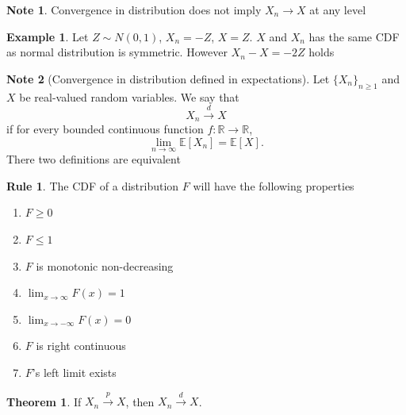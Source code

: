 \documentclass[11pt]{article}
\theoremstyle{definition}
\newtheorem{reg}{Rule}[section]
\newtheorem{note}{Note}[section]
\newtheorem{exmp}{Example}[section]
\newtheorem{theo}{Theorem}[section]
\begin{document}
\begin{note}
    Convergence in distribution does not imply $X_n \rightarrow X$ at any level
\end{note}
\begin{exmp}
Let $Z\sim N(0,1)$, $X_n = -Z$, $X = Z$. $X$ and $X_n$ has the same CDF as normal distribution is symmetric. However $X_n-X=-2Z$ holds
\end{exmp}

\begin{note}[Convergence in distribution defined in expectations]
Let $\{X_n\}_{n\ge1}$ and $X$ be real-valued random variables.
We say that
\[
X_n \xrightarrow{d} X
\]
if for every bounded continuous function $f : \mathbb{R} \to \mathbb{R}$,
\[
\lim_{n\to\infty} \mathbb{E}[X_n] = \mathbb{E}[X].
\]
There two definitions are equivalent
\end{note}
\begin{reg}
The CDF of a distribution $F$ will have the following properties
\begin{enumerate}
    \item $F\geq0$
    \item $F\leq1$
    \item $F$ is monotonic non-decreasing
    \item $\lim_{x\rightarrow\infty}F(x)=1$
    \item $\lim_{x\rightarrow-\infty}F(x)=0$
    \item $F$ is right continuous
    \item $F$'s left limit exists
    
\end{enumerate}
\end{reg}

\begin{theo}
If \(X_n \xrightarrow{p} X\), then \(X_n \xrightarrow{d} X\).
\end{theo}
\end{document}
